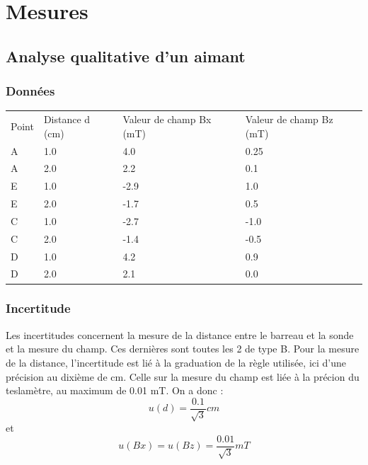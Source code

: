 \documentclass[a4paper,9pt,french]{scrartcl}
\begin{document}
\section{Mesures}
\subsection{Analyse qualitative d'un aimant}
\subsubsection{Données}
\begin{center}
\begin{tabular}{llll}
Point & Distance d (cm) & Valeur de champ Bx (mT) & Valeur de champ Bz (mT)\\
A & 1.0 & 4.0 & 0.25\\
A & 2.0 & 2.2 & 0.1\\
E & 1.0 & -2.9 & 1.0\\
E & 2.0 & -1.7 & 0.5\\
C & 1.0 & -2.7 & -1.0\\
C & 2.0 & -1.4 & -0.5\\
D & 1.0 & 4.2 & 0.9\\
D & 2.0 & 2.1 &0.0
\end{tabular}
\end{center}
\subsubsection{Incertitude}
Les incertitudes concernent la mesure de la distance entre le barreau et la sonde et la mesure du champ. Ces dernières sont toutes les 2 de type B. Pour la mesure de la distance, l'incertitude est lié à la graduation de la règle utilisée, ici d'une précision au dixième de cm. Celle sur la mesure du champ est liée à la précion du teslamètre, au maximum de 0.01 mT. On a donc : \[u(d) = \frac{0.1}{\sqrt{3}}cm\] et  \[u(Bx) = u(Bz) = \frac{0.01}{\sqrt{3}}mT\]
\end{document}
